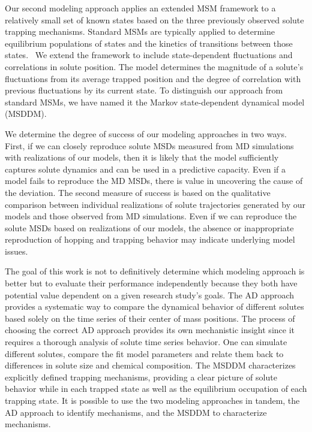 \documentclass[journal=jctcce,manuscript=article]{achemso}
\begin{document}
  Our second modeling approach applies an extended MSM framework to a
  relatively small set of known states based on the three previously observed
  solute trapping mechanisms. Standard MSMs are typically applied to determine
  equilibrium populations of states and the kinetics of transitions between
  those states.~\cite{bowman_using_2009} We extend the framework to include
  state-dependent fluctuations and correlations in solute position. The model
  determines the magnitude of a solute's fluctuations from its average trapped
  position and the degree of correlation with previous fluctuations by its current
  state. To distinguish our approach from standard MSMs, we have named it the
  Markov state-dependent dynamical model (MSDDM).
  
  We determine the degree of success of our modeling approaches in two ways.
  First, if we can closely reproduce solute MSDs measured from MD simulations
  with realizations of our models, then it is likely that the model
  sufficiently captures solute dynamics and can be used in a predictive
  capacity. Even if a model fails to reproduce the MD MSDs, there is value in
  uncovering the cause of the deviation. The second measure of success is based
  on the qualitative comparison between individual realizations of solute 
  trajectories generated by our models and those observed from MD simulations. 
  Even if we can reproduce the solute MSDs based on realizations of our models,
  the absence or inappropriate reproduction of hopping and trapping behavior may
  indicate underlying model issues. 
  
  The goal of this work is not to definitively determine which modeling
  approach is better but to evaluate their performance independently because
  they both have potential value dependent on a given research study's goals.
  The AD approach provides a systematic way to compare the dynamical behavior
  of different solutes based solely on the time series of their center of mass
  positions. The process of choosing the correct AD approach provides its own
  mechanistic insight since it requires a thorough analysis of solute time
  series behavior. One can simulate different solutes, compare the fit model
  parameters and relate them back to differences in solute size and chemical
  composition. The MSDDM characterizes explicitly defined trapping mechanisms,
  providing a clear picture of solute behavior while in each trapped state as
  well as the equilibrium occupation of each trapping state.  It is possible to
  use the two modeling approaches in tandem, the AD approach to identify
  mechanisms, and the MSDDM to characterize mechanisms. 
  
\end{document}
